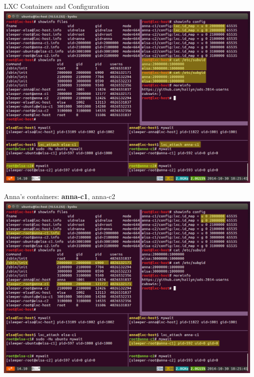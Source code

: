 \documentclass{beamer}
\begin{document}
\begin{frame}
LXC Containers and Configuration
\includegraphics[width=\textwidth]{screen-lxc-config.png}
\end{frame}

\begin{frame}
Anna's containers: \textbf{anna-c1}, anna-c2
\includegraphics[width=\textwidth]{screen-anna-c1.png}
\end{frame}
\end{document}
